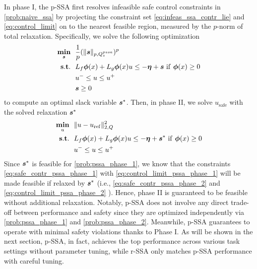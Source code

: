 In phase I, the p-SSA first resolves infeasible safe control constraints in \eqref{prob:naive_ssa} by projecting the constraint set \eqref{eq:infeas_ssa_contr_lie}
 and \eqref{eq:control_limit} on to the nearest feasible region, measured by the $p$-norm of  total relaxation.
Specifically, we solve the following optimization
\begin{subequations}\label{prob:pssa_phase_1}
\begin{align}
\mathop{\underset{\bm{s}}{\mathop{\mathbf{min}}}}~~ & \frac{1}{p}(\|\bm{s}\|_{p,Q^{pssa}_s})^p  \\
\mathop{\mathbf{s.t.}}~~ & L_f\bm{\phi}(x) + L_g\bm{\phi}(x) u \leq -\bm{\eta} + \bm{s} ~\mathrm{if}~\bm{\phi}(x) \geq 0 \label{eq:safe_contr_pssa_phase_1}\\ 
& u^- \leq u \leq u^+ \label{eq:control_limit_pssa_phase_1}\\
&  \bm{s} \geq 0
\end{align}
\end{subequations}
to compute an optimal slack variable $\bm{s}^*$.
Then, in phase II, we solve $u_\mathrm{safe}$ with the solved relaxation $\bm{s}^*$
\begin{subequations}\label{prob:pssa_phase_2}
\begin{align}
\mathop{\underset{u}{\mathop{\mathbf{min}}}}~~ & \|u-u_\mathrm{ref}\|_{2,Q}^2  \\
\mathop{\mathbf{s.t.}}~~ & L_f\bm{\phi}(x) + L_g\bm{\phi}(x) u \leq -\bm{\eta} + \bm{s}^* ~\mathrm{if}~\bm{\phi}(x) \geq 0 \label{eq:safe_contr_pssa_phase_2}\\ 
& u^- \leq u \leq u^+ \label{eq:control_limit_pssa_phase_2}
\end{align}
\end{subequations}
Since $\bm{s}^*$ is feasible for \eqref{prob:pssa_phase_1}, we know that the constraints \eqref{eq:safe_contr_pssa_phase_1} with \eqref{eq:control_limit_pssa_phase_1} will be made feasible if relaxed by $\bm{s}^*$ (i.e.,  \eqref{eq:safe_contr_pssa_phase_2} and \eqref{eq:control_limit_pssa_phase_2} ).
Hence, phase II is guaranteed to be feasible without additional relaxation. 
Notably, p-SSA does not involve any direct trade-off between performance and safety since they are optimized independently via \eqref{prob:pssa_phase_1} and \eqref{prob:pssa_phase_2}.
Meanwhile, p-SSA guarantees to operate with minimal safety violations thanks to Phase I.
As will be shown in the next section, p-SSA, in fact, achieves the top performance across various task settings without parameter tuning, while r-SSA only matches p-SSA performance with careful tuning.

